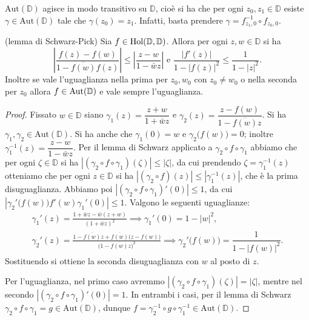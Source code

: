 \begin{oss} \label{transi}
  $\text{Aut}(\mathbb{D})$ agisce in modo transitivo su $\mathbb{D}$, cioè si ha che per ogni $z_0, z_1 \in \mathbb{D}$ esiste $\gamma \in \text{Aut}(\mathbb{D})$ tale che $\gamma(z_0)=z_1$. Infatti, basta prendere $\gamma=f_{z_1, 0}^{-1} \circ f_{z_0, 0}$.
\end{oss}

\begin{lm} \label{SP}
  (lemma di Schwarz-Pick) Sia $f \in \text{\normalfont{Hol}}(\mathbb{D},\mathbb{D})$.
  Allora per ogni $z, w \in \mathbb{D}$ si ha
  $$\left|\frac{f(z)-f(w)}{1-\overline{f(w)}f(z)}\right| \le \left|\frac{z-w}{1-\bar{w}z}\right| \text{ e } \frac{|f'(z)|}{1-|f(z)|^2} \le \frac{1}{1-|z|^2}.$$
  Inoltre se vale l'uguaglianza nella prima per $z_0, w_0$ con $z_0 \not=w_0$ o nella seconda per $z_0$ allora $f \in \text{\normalfont{Aut}}(\mathbb{D})$ e vale sempre l'uguaglianza.
\end{lm}

\begin{proof}
  Fissato $w \in \mathbb{D}$ siano $\gamma_1(z)=\dfrac{z+w}{1+\bar{w}z}$ e $\gamma_2(z)=\dfrac{z-f(w)}{1-\overline{f(w)}z}$. Si ha $\gamma_1, \gamma_2 \in \text{Aut}(\mathbb{D})$. Si ha anche che $\gamma_1(0)=w$ e $\gamma_2\bigl(f(w)\bigr)=0$; inoltre $\gamma_1^{-1}(z)=\dfrac{z-w}{1-\bar{w}z}$.
  Per il lemma di Schwarz applicato a $\gamma_2 \circ f \circ \gamma_1$ abbiamo che per ogni $\zeta \in \mathbb{D}$ si ha $|(\gamma_2 \circ f \circ \gamma_1)(\zeta)| \le |\zeta|$, da cui prendendo $\zeta=\gamma_1^{-1}(z)$ otteniamo che per ogni $z \in \mathbb{D}$ si ha $|(\gamma_2 \circ f)(z)| \le |\gamma_1^{-1}(z)|$, che è la prima disuguaglianza.
  Abbiamo poi $|(\gamma_2 \circ f \circ \gamma_1)'(0)| \le 1$, da cui $|\gamma_2'\bigl(f(w)\bigr)f'(w)\gamma_1'(0)| \le 1$. Valgono le seguenti uguaglianze:
  \begin{gather*}
    \gamma_1'(z)=\frac{1+\bar{w}z-\bar{w}(z+w)}{(1+\bar{w}z)^2} \implies \gamma_1'(0)=1-|w|^2, \\
    \gamma_2'(z)=\frac{1-\overline{f(w)}z+\overline{f(w)}\bigl(z-f(w)\bigr)}{\bigl(1-\overline{f(w)}z\bigr)^2} \implies \gamma_2'\bigl(f(w)\bigr)=\dfrac{1}{1-|f(w)|^2}.
  \end{gather*}
  Sostituendo si ottiene la seconda disuguaglianza con $w$ al posto di $z$.

  Per l'uguaglianza, nel primo caso avremmo $|(\gamma_2 \circ f \circ \gamma_1)(\zeta)|=|\zeta|$, mentre nel secondo $|(\gamma_2\circ f\circ\gamma_1)'(0)|=1$. In entrambi i casi, per il lemma di Schwarz $\gamma_2 \circ f \circ \gamma_1=g \in \text{Aut}(\mathbb{D})$, dunque $f=\gamma_2^{-1}\circ g \circ \gamma_1^{-1} \in \text{Aut}(\mathbb{D})$.
\end{proof}

